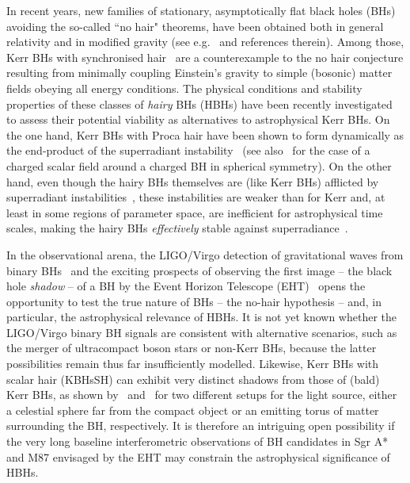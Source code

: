 \documentclass[twocolumn,aps,showpacs,showkeys,prd,superscriptaddress,byrevtex, amsmath]{revtex4-1}
\begin{document}
In recent years, new families of stationary, asymptotically flat black holes (BHs) avoiding the so-called ``no hair" theorems, have been obtained both in general relativity and in modified gravity (see e.g.~\cite{Herdeiro:2015_review} and references therein). Among those, Kerr BHs with synchronised hair~\cite{Herdeiro:2014a,Herdeiro:2016} are a counterexample to the no hair conjecture resulting from minimally coupling Einstein's gravity to simple (bosonic) matter fields obeying all energy conditions. The physical conditions and stability properties of these classes of {\it hairy} BHs  (HBHs) have been recently investigated to assess their potential viability as  alternatives to astrophysical Kerr BHs.  On the one hand, Kerr BHs with Proca hair have been shown to form dynamically as the end-product of the superradiant instability~\cite{East:2017,Herdeiro:2017} (see also~\cite{Sanchis-Gual:2016,Bosch:2016} for the case of a charged scalar field around a charged BH in spherical  symmetry). On the other hand, even though the hairy BHs themselves are (like Kerr BHs) afflicted by superradiant instabilities~\cite{Herdeiro:2014b,Ganchev:2018}, these instabilities are weaker than for Kerr and, at least in some regions of parameter space, are inefficient for astrophysical time scales, making the hairy BHs {\it effectively} stable against superradiance~\cite{Degollado:2018}. 

In the observational arena, the LIGO/Virgo detection of gravitational waves from binary BHs~\cite{Abbott2016, Abbott:2016nmj, Abbott:2017vtc, Abbott:2017oio, Abbott:2017gyy} and the exciting prospects of observing the first image -- the black hole {\it shadow} -- of a BH by the Event Horizon Telescope (EHT)~\cite{Fish:2016} opens the opportunity to test the true nature of BHs -- the no-hair hypothesis -- and, in particular, the astrophysical relevance of HBHs. It is not yet known whether the LIGO/Virgo binary BH signals are consistent with alternative scenarios, such as the merger of ultracompact boson stars or non-Kerr BHs, because the latter possibilities remain thus far insufficiently modelled. Likewise, Kerr BHs with scalar hair (KBHsSH) can exhibit very distinct shadows from those of (bald) Kerr BHs, as shown by~\cite{Cunha:2015} and~\cite{Vincent:2016} for two different setups for the light source, either a celestial sphere far from the compact object or an emitting torus of matter surrounding the BH, respectively. It is therefore an intriguing open possibility if the very long baseline interferometric observations of BH candidates in Sgr A* and M87 envisaged by the EHT may constrain the astrophysical significance of HBHs.
\end{document}
